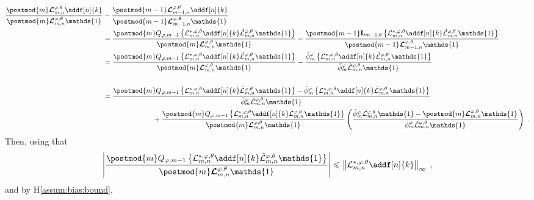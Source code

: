 \documentclass{article}
\newcommand{\precpar}{\varphi}
\newcommand{\1}{\mathbbm{1}}
\newcommand{\retrokmod}{\boldsymbol{\mathcal{L}}^{\precpar,\theta}}
\newcommand{\uk}[1]{\mathbf{L}_{#1}}
\def\1{\mathds{1}}
\newcommand{\eqsp}{\;}
\begin{document}
\begin{align*}
 \frac{\postmod{m} \retrokmod_{m, n} \addf[n]{k}}{\postmod{m} \retrokmod_{m, n} \1_{}} &- \frac{\postmod{m - 1} \retrokmod_{m - 1, n} \addf[n]{k}}{\postmod{m - 1} \retrokmod_{m - 1, n} \1_{}}  \\
&= \frac{\postmod{m} Q_{\varphi,m-1} \left\{\mathcal{L}^{*,\varphi,\theta}_{m, n} \addf[n]{k}\tilde{\mathcal{L}}^{\varphi,\theta}_{m, n} \1\right\}}{\postmod{m} \retrokmod_{m, n} \1_{}} - \frac{\postmod{m - 1} \uk{m-1,\theta} \left\{\mathcal{L}^{*,\varphi,\theta}_{m, n} \addf[n]{k}\tilde{\mathcal{L}}^{\varphi,\theta}_{m, n} \1\right\}}{\postmod{m - 1} \retrokmod_{m - 1, n} \1_{}} \\ 
&=  \frac{\postmod{m} Q_{\varphi,m-1} \left\{\mathcal{L}^{*,\varphi,\theta}_{m, n} \addf[n]{k}\tilde{\mathcal{L}}^{\varphi,\theta}_{m, n} \1\right\}}{\postmod{m} \retrokmod_{m, n} \1_{}} - \frac{\tilde\phi^\varphi_m\left\{\mathcal{L}^{*,\varphi,\theta}_{m, n} \addf[n]{k}\tilde{\mathcal{L}}^{\varphi,\theta}_{m, n} \1\right\}}{\tilde\phi^\varphi_m\tilde{\mathcal{L}}^{\varphi,\theta}_{m, n}\1_{}} \\ \\
&= \frac{\postmod{m} Q_{\varphi,m-1} \left\{\mathcal{L}^{*,\varphi,\theta}_{m, n} \addf[n]{k}\tilde{\mathcal{L}}^{\varphi,\theta}_{m, n} \1\right\} - \tilde\phi^\varphi_m \left\{\mathcal{L}^{*,\varphi,\theta}_{m, n} \addf[n]{k}\tilde{\mathcal{L}}^{\varphi,\theta}_{m, n} \1\right\}}{\tilde\phi^\varphi_m\tilde{\mathcal{L}}^{\varphi,\theta}_{m, n}\1_{}} \\
&\hspace{2.5cm}+  \frac{\postmod{m} Q_{\varphi,m-1}\left\{\mathcal{L}^{*,\varphi,\theta}_{m, n} \addf[n]{k}\tilde{\mathcal{L}}^{\varphi,\theta}_{m, n} \1\right\}}{\postmod{m} \retrokmod_{m, n} \1_{}}\left(\frac{\tilde\phi^\varphi_m\tilde{\mathcal{L}}^{\varphi,\theta}_{m, n}\1-\postmod{m} \retrokmod_{m, n} \1_{}}{\tilde\phi^\varphi_m\tilde{\mathcal{L}}^{\varphi,\theta}_{m, n}\1_{}}\right)\eqsp.
\end{align*}
Then, using that
$$
\left|\frac{\postmod{m} Q_{\varphi,m-1} \left\{\mathcal{L}^{*,\varphi,\theta}_{m, n} \addf[n]{k}\tilde{\mathcal{L}}^{\varphi,\theta}_{m, n} \1\right\}}{\postmod{m} \retrokmod_{m, n} \1_{}}\right|\leqslant \left\|\mathcal{L}^{*,\varphi,\theta}_{m, n} \addf[n]{k}\right\|_\infty\eqsp,
$$
and by H\ref{assum:bias:bound},
\end{document}
